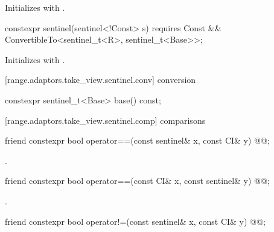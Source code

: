 \begin{itemdescr}
\pnum
\effects Initializes  with .
\end{itemdescr}

%
\begin{itemdecl}
constexpr sentinel(sentinel<!Const> s)
  requires Const && ConvertibleTo<sentinel_t<R>, sentinel_t<Base>>;
\end{itemdecl}

\begin{itemdescr}
\pnum
\effects Initializes  with .
\end{itemdescr}

[range.adaptors.take_view.sentinel.conv]{ conversion}

\begin{itemdecl}
constexpr sentinel_t<Base> base() const;
\end{itemdecl}

\begin{itemdescr}
\pnum
\oldtxt{\returns}  
\end{itemdescr}

[range.adaptors.take_view.sentinel.comp]{ comparisons}

\begin{itemdecl}
friend constexpr bool operator==(const sentinel& x, const CI& y)
  @@;
\end{itemdecl}

\begin{itemdescr}
\pnum
\returns {}.
\end{itemdescr}

\begin{itemdecl}
friend constexpr bool operator==(const CI& x, const sentinel& y)
  @@;
\end{itemdecl}

\begin{itemdescr}
\pnum
\returns {}.
\end{itemdescr}

%
\begin{itemdecl}
friend constexpr bool operator!=(const sentinel& x, const CI& y)
  @@;
\end{itemdecl}

